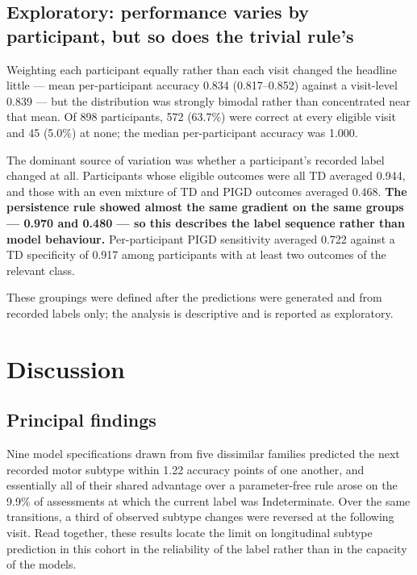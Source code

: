 \documentclass[journal]{IEEEtran}
\begin{document}
\subsection{Exploratory: performance varies by participant, but so does the
trivial rule's}

Weighting each participant equally rather than each visit changed the headline
little --- mean per-participant accuracy 0.834 (0.817--0.852) against a
visit-level 0.839 --- but the distribution was strongly bimodal rather than
concentrated near that mean. Of 898 participants, 572 (63.7\%) were correct at
every eligible visit and 45 (5.0\%) at none; the median per-participant accuracy
was 1.000.

The dominant source of variation was whether a participant's recorded label
changed at all. Participants whose eligible outcomes were all TD averaged 0.944,
and those with an even mixture of TD and PIGD outcomes averaged 0.468.
\textbf{The persistence rule showed almost the same gradient on the same groups
--- 0.970 and 0.480 --- so this describes the label sequence rather than model
behaviour.} Per-participant PIGD sensitivity averaged 0.722 against a TD
specificity of 0.917 among participants with at least two outcomes of the
relevant class.

These groupings were defined after the predictions were generated and from
recorded labels only; the analysis is descriptive and is reported as
exploratory.

\section{Discussion}

\subsection{Principal findings}
Nine model specifications drawn from five dissimilar families predicted the next
recorded motor subtype within 1.22 accuracy points of one another, and
essentially all of their shared advantage over a parameter-free rule arose on
the 9.9\% of assessments at which the current label was Indeterminate. Over the
same transitions, a third of observed subtype changes were reversed at the
following visit. Read together, these results locate the limit on longitudinal
subtype prediction in this cohort in the reliability of the label rather than in
the capacity of the models.
\end{document}
